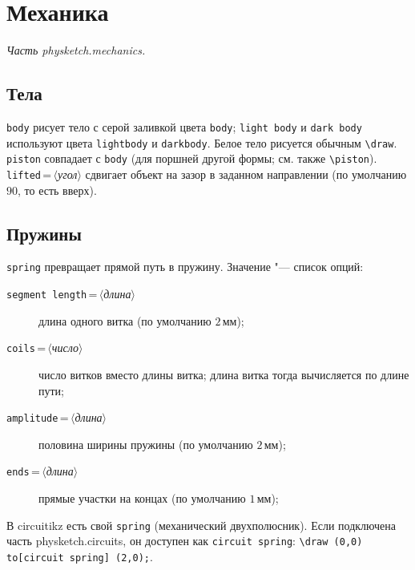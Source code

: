 \documentclass[a4paper,11pt]{article}
\newcommand\pkg[1]{\textsf{#1}}
\newcommand\cs[1]{\texttt{\textbackslash#1}}
\newcommand\key[1]{\texttt{#1}}
\newcommand\meta[1]{\ensuremath{\langle}\textit{#1}\ensuremath{\rangle}}
\begin{document}
\section{Механика}
\emph{Часть \pkg{physketch.mechanics}.}

\subsection{Тела}
\key{body} рисует тело с серой заливкой цвета \texttt{body};
\key{light body} и \key{dark body} используют цвета \texttt{lightbody} и
\texttt{darkbody}. Белое тело рисуется обычным \cs{draw}. \key{piston}
совпадает с \key{body} (для поршней другой формы; см. также \cs{piston}).
\key{lifted}\,=\,\meta{угол} сдвигает объект на зазор в заданном
направлении (по умолчанию \(90\), то есть вверх).
\begin{example}
\end{example}

\subsection{Пружины}
\key{spring} превращает прямой путь в пружину. Значение "--- список опций:
\begin{description}
  \item[\key{segment length}\,=\,\meta{длина}] длина одного витка (по
    умолчанию \(2\,\text{мм}\));
  \item[\key{coils}\,=\,\meta{число}] число витков вместо длины витка; длина
    витка тогда вычисляется по длине пути;
  \item[\key{amplitude}\,=\,\meta{длина}] половина ширины пружины (по
    умолчанию \(2\,\text{мм}\));
  \item[\key{ends}\,=\,\meta{длина}] прямые участки на концах (по умолчанию
    \(1\,\text{мм}\));
\end{description}
\begin{example}
\end{example}
В \pkg{circuitikz} есть свой \key{spring} (механический двухполюсник). Если
подключена часть \pkg{physketch.circuits}, он доступен как
\key{circuit spring}: \verb|\draw (0,0) to[circuit spring] (2,0);|.
\end{document}
